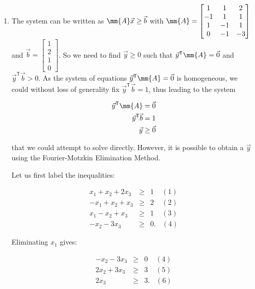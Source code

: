 \begin{enumerate}
\def\labelenumi{\arabic{enumi}.}
\tightlist
\item
  The system can be written as \(\mm{A}\vec{x} \geq \vec{b}\) with
  \(\mm{A} = \begin{bmatrix} 1 & 1 & 2 \\ -1 & 1 & 1 \\ 1 & -1 & 1 \\ 0 & -1 & -3 \end{bmatrix}\)
  and \(\vec{b} = \begin{bmatrix} 1 \\ 2 \\ 1 \\ 0\end{bmatrix}\). So we
  need to find \(\vec{y} \geq 0\) such that
  \(\vec{y}^\mathsf{T} \mm{A} = \vec{0}\) and
  \(\vec{y}^\mathsf{T} \vec{b} \gt 0\). As the system of equations
  \(\vec{y}^\mathsf{T} \mm{A} = \vec{0}\) is homogeneous, we could
  without loss of generality fix \(\vec{y}^\mathsf{T} \vec{b} = 1\),
  thus leading to the system

  \begin{eqnarray*}
  \vec{y}^\mathsf{T}\mm{A} = \vec{0} \\
  \vec{y}^\mathsf{T}\vec{b} = 1 \\
  \vec{y} \geq \vec{0}
  \end{eqnarray*}

  that we could attempt to solve directly. However, it is possible to
  obtain a \(\vec{y}\) using the Fourier-Motzkin Elimination Method.

  Let us first label the inequalities:

  \begin{eqnarray*}
  x_1 + x_2 + 2x_3& \geq & 1~~~~~(1) \\
  -x_1 + x_2 + x_3 & \geq & 2~~~~~(2) \\
  x_1-x_2 + x_3  & \geq & 1~~~~~(3) \\
  -x_2 - 3x_3 & \geq & 0.~~~~(4)
  \end{eqnarray*}

  Eliminating \(x_1\) gives:

  \begin{eqnarray*}
  -x_2 - 3x_3 & \geq & 0~~~~~(4) \\
  2x_2 + 3x_3& \geq & 3~~~~~(5) \\
  2x_3  & \geq & 3.~~~~(6) \\
  \end{eqnarray*}


\end{enumerate}
